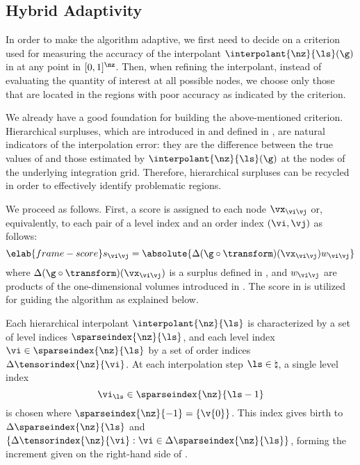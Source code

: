 \subsection{Hybrid Adaptivity}

In order to make the algorithm adaptive, we first need to decide on a criterion
used for measuring the accuracy of the interpolant $\interpolant{\nz}{\ls}(\g)$
in  at any point in $[0, 1]^\nz$. Then, when refining
the interpolant, instead of evaluating the quantity of interest \g at all
possible nodes, we choose only those that are located in the regions with poor
accuracy as indicated by the criterion.

We already have a good foundation for building the above-mentioned criterion.
Hierarchical surpluses, which are introduced in  and
defined in , are natural indicators of the
interpolation error: they are the difference between the true values of \g and
those estimated by $\interpolant{\nz}{\ls}(\g)$ at the nodes of the underlying
integration grid. Therefore, hierarchical surpluses can be recycled in order to
effectively identify problematic regions.

We proceed as follows. First, a score is assigned to each node $\vx_{\vi \vj}$
or, equivalently, to each pair of a level index and an order index $(\vi, \vj)$
as follows:
\begin{equation} \elab{frame-score}
  s_{\vi \vj} = \absolute{\Delta(\g \circ \transform)(\vx_{\vi \vj}) w_{\vi \vj}}
\end{equation}
where $\Delta(\g \circ \transform)(\vx_{\vi \vj})$ is a surplus defined in
, and $w_{\vi \vj}$ are products of the
one-dimensional volumes introduced in . The score in
 is utilized for guiding the algorithm as explained below.

Each hierarchical interpolant $\interpolant{\nz}{\ls}$ is characterized by a set
of level indices $\sparseindex{\nz}{\ls}$, and each level index $\vi \in
\sparseindex{\nz}{\ls}$ by a set of order indices
$\Delta\tensorindex{\nz}{\vi}$. At each interpolation step $\ls \in \natural$, a
single level index
\[
  \vi_{\ls} \in \sparseindex{\nz}{\ls - 1}
\]
is chosen where $\sparseindex{\nz}{-1} = \{ \v{0} \}$. This index gives birth to
$\Delta\sparseindex{\nz}{\ls}$ and $\{ \Delta\tensorindex{\nz}{\vi}: \vi \in
\Delta\sparseindex{\nz}{\ls} \}$, forming the increment given on the right-hand
side of .

